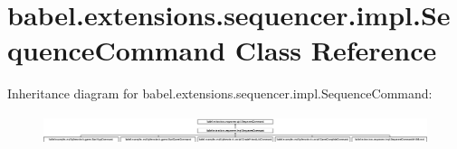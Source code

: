 \hypertarget{classbabel_1_1extensions_1_1sequencer_1_1impl_1_1_sequence_command}{\section{babel.\-extensions.\-sequencer.\-impl.\-Sequence\-Command Class Reference}
\label{classbabel_1_1extensions_1_1sequencer_1_1impl_1_1_sequence_command}
}
Inheritance diagram for babel.\-extensions.\-sequencer.\-impl.\-Sequence\-Command\-:\begin{figure}[H]
\begin{center}
\leavevmode
\includegraphics[height=0.863753cm]{classbabel_1_1extensions_1_1sequencer_1_1impl_1_1_sequence_command}
\end{center}
\end{figure}
